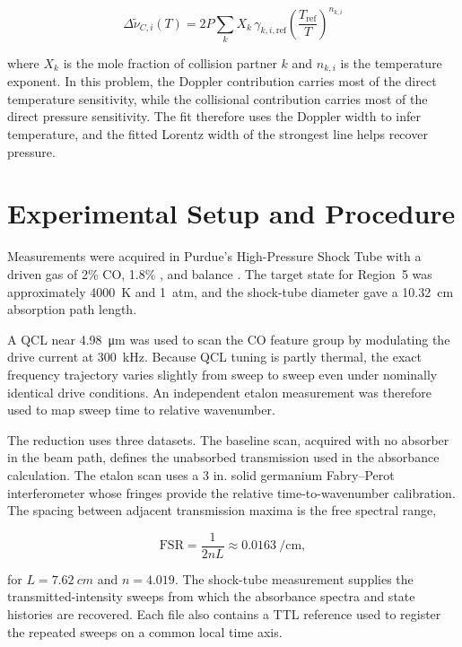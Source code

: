 \documentclass[12pt,letterpaper]{article}
\begin{document}
\begin{equation}
  \Delta\tilde{\nu}_{C,i}(T)
  =
  2P\sum_k X_k\,\gamma_{k,i,\mathrm{ref}}
  \left(\frac{T_{\mathrm{ref}}}{T}\right)^{n_{k,i}}
\end{equation}

where $X_k$ is the mole fraction of collision partner $k$ and $n_{k,i}$ is the temperature exponent. In this problem, the Doppler contribution carries most of the direct temperature sensitivity, while the collisional contribution carries most of the direct pressure sensitivity. The fit therefore uses the Doppler width to infer temperature, and the fitted Lorentz width of the strongest line helps recover pressure.

\section{Experimental Setup and Procedure}

Measurements were acquired in Purdue's High-Pressure Shock Tube with a driven gas of 2\% CO, 1.8\% , and balance . The target state for Region~5 was approximately \SI{4000}{K} and \SI{1}{atm}, and the shock-tube diameter gave a \SI{10.32}{cm} absorption path length.

A QCL near \SI{4.98}{\micro\meter} was used to scan the CO feature group by modulating the drive current at \SI{300}{kHz}. Because QCL tuning is partly thermal, the exact frequency trajectory varies slightly from sweep to sweep even under nominally identical drive conditions. An independent etalon measurement was therefore used to map sweep time to relative wavenumber.

The reduction uses three datasets. The baseline scan, acquired with no absorber in the beam path, defines the unabsorbed transmission used in the absorbance calculation. The etalon scan uses a 3 in. solid germanium Fabry--Perot interferometer whose fringes provide the relative time-to-wavenumber calibration. The spacing between adjacent transmission maxima is the free spectral range,

\begin{equation}
  \mathrm{FSR}=\frac{1}{2nL}\approx\SI{0.0163}{\per\centi\meter},
\end{equation}

for $L=\SI{7.62}{cm}$ and $n=4.019$. The shock-tube measurement supplies the transmitted-intensity sweeps from which the absorbance spectra and state histories are recovered. Each file also contains a TTL reference used to register the repeated sweeps on a common local time axis.
\end{document}
